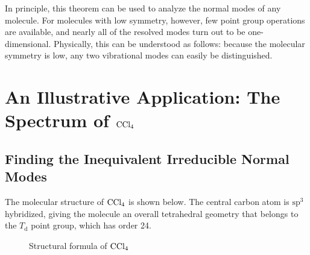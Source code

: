 \documentclass[lang=en, column=onecolumn, mathfont=times]{spArticle}
\begin{document}
In principle, this theorem can be used to analyze the normal modes of any molecule. For molecules with low symmetry, however, few point group operations are available, and nearly all of the resolved modes turn out to be one-dimensional. Physically, this can be understood as follows: because the molecular symmetry is low, any two vibrational modes can easily be distinguished.


\section{An Illustrative Application: The Spectrum of \texorpdfstring{$\ce{CCl4}$}{CCl4}}

\subsection{Finding the Inequivalent Irreducible Normal Modes}
\label{subsec}

The molecular structure of $\ce{CCl4}$ is shown below. The central carbon atom is $\mathrm{sp}^3$ hybridized, giving the molecule an overall tetrahedral geometry that belongs to the $T_\mathrm{d}$ point group, which has order 24.

\begin{figure}[H]
    \centering
    \caption{Structural formula of \texorpdfstring{$\ce{CCl_4}$}{CCl4}}
\end{figure}
\end{document}
